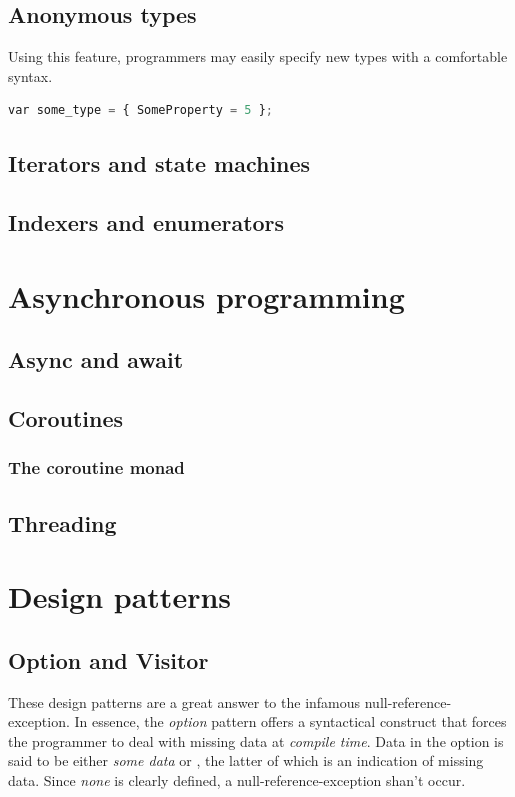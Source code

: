 \documentclass{article}
\begin{document}
\subsection{Anonymous types}
Using this feature, programmers may easily specify new types with a comfortable syntax.

\begin{lstlisting}[language=Python]
  var some_type = { SomeProperty = 5 };
\end{lstlisting}

\subsection{Iterators and state machines}


\subsection{Indexers and enumerators}

\newpage

\section{Asynchronous programming}
\subsection{Async and await}
\subsection{Coroutines}
\subsubsection{The coroutine monad}
\subsection{Threading}

\newpage

\section{Design patterns}

\subsection{Option and Visitor}
These design patterns are a great answer to the infamous null-reference-exception.
In essence, the {\em option} pattern offers a syntactical construct that forces the programmer to deal with missing data at {\em compile time}.
Data in the option is said to be either {\em some data} or {\none}, the latter of which is an indication of missing data.
Since {\em none} is clearly defined, a null-reference-exception shan't occur.
\end{document}
